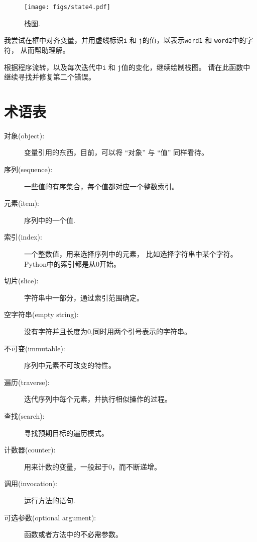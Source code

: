 \documentclass[10pt]{book}
\begin{document}
\begin{figure}
\centerline
{\texttt{[image: figs/state4.pdf]}}
\caption{栈图.}
\label{fig.state4}
\end{figure}

我尝试在框中对齐变量，并用虚线标识{\tt i} 和
{\tt j}的值，以表示{\tt word1} 和 {\tt word2}中的字符，
从而帮助理解。

根据程序流转，以及每次迭代中{\tt i} 和 {\tt j}值的变化，继续绘制栈图。
请在此函数中继续寻找并修复第二个错误。
\label{isreverse}


\section{术语表}

\begin{description}

\item[对象(object):] 变量引用的东西，目前，可以将
``对象'' 与 ``值'' 同样看待。

\item[序列(sequence):] 一些值的有序集合，每个值都对应一个整数索引。

\item[元素(item):] 序列中的一个值.

\item[索引(index):] 一个整数值，用来选择序列中的元素，
比如选择字符串中某个字符。Python中的索引都是从0开始。

\item[切片(slice):] 字符串中一部分，通过索引范围确定。

\item[空字符串(empty string):] 没有字符并且长度为0,同时用两个引号表示的字符串。

\item[不可变(immutable):] 序列中元素不可改变的特性。

\item[遍历(traverse):] 迭代序列中每个元素，并执行相似操作的过程。

\item[查找(search):] 寻找预期目标的遍历模式。

\item[计数器(counter):] 用来计数的变量，一般起于0，而不断递增。

\item[调用(invocation):] 运行方法的语句.

\item[可选参数(optional argument):] 函数或者方法中的不必需参数。

\end{description}
\end{document}
